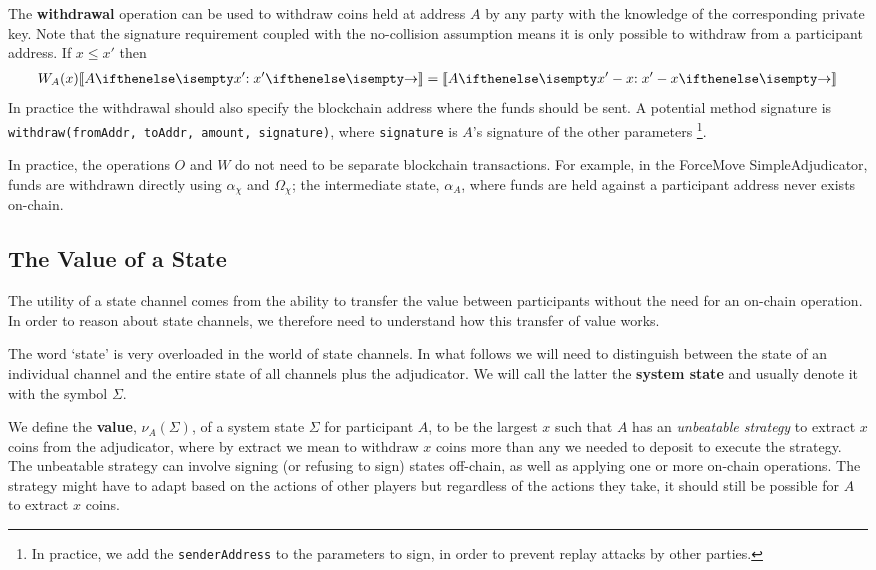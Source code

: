 \documentclass{article}
\begin{document}
The \textbf{withdrawal} operation can be used to withdraw coins held at address $A$ by any
party with the knowledge of the corresponding private key. 
Note that the signature requirement coupled with the no-collision assumption means
it is only possible to withdraw from a participant address.
If $x \leq x'$ then
\begin{align*}
W_A(x) \adj{\holds{A}{x'}{}} = \adj{\holds{A}{x'-x}{}}
\end{align*}
In practice the withdrawal should also specify the blockchain address where the funds should be sent.
A potential method signature is \texttt{withdraw(fromAddr, toAddr, amount, signature)}, 
where \texttt{signature} is $A$'s signature of the other parameters
\footnote{In practice, we add the \texttt{senderAddress} to the parameters to sign,
in order to prevent replay attacks by other parties.}.

In practice, the operations $O$ and $W$ do not need to be separate blockchain transactions.
For example, in the ForceMove SimpleAdjudicator, funds are withdrawn directly using $\alpha_\chi$ and $\Omega_\chi$;
the intermediate state, $\alpha_A$, where funds are held against a participant address never exists on-chain.

\subsection{The Value of a State}\label{section:value-of-a-state}

The utility of a state channel comes from the ability to transfer the value
between participants without the need for an on-chain operation.
In order to reason about state channels, we therefore need to understand how this transfer
of value works.

The word `state' is very overloaded in the world of state channels.
In what follows we will need to distinguish between the state of an individual channel and
the entire state of all channels plus the adjudicator.
We will call the latter the \textbf{system state} and usually denote it with the symbol $\Sigma$.

We define the \textbf{value}, $\nu_A(\Sigma)$, of a system state $\Sigma$ for participant $A$,
to be the largest $x$ such that $A$ has an \textit{unbeatable strategy} to extract $x$
coins from the adjudicator, where by extract we mean to withdraw $x$ coins more than any we needed to deposit to execute the strategy.
The unbeatable strategy can involve signing (or refusing to sign) states off-chain, as well as
applying one or more on-chain operations.
The strategy might have to adapt based on the actions of other players but regardless of
the actions they take, it should still be possible for $A$ to extract $x$ coins.
\end{document}

